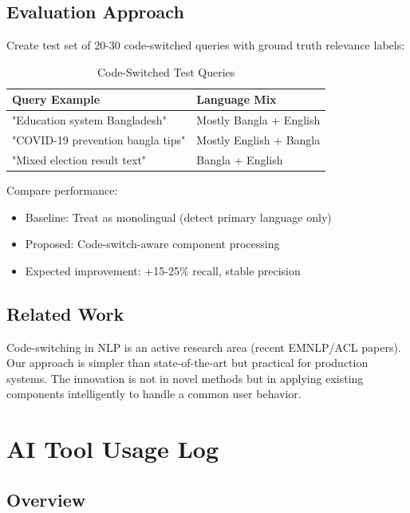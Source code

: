 \documentclass[12pt,a4paper]{report}
\begin{document}
\section{Evaluation Approach}

Create test set of 20-30 code-switched queries with ground truth relevance labels:

\begin{table}[H]
    \centering
    \begin{tabular}{|l|l|}
        \hline
        \textbf{Query Example} & \textbf{Language Mix} \\
        \hline
        "Education system Bangladesh" & Mostly Bangla + English \\
        \hline
        "COVID-19 prevention bangla tips" & Mostly English + Bangla \\
        \hline
        "Mixed election result text" & Bangla + English \\
        \hline
    \end{tabular}
    \caption{Code-Switched Test Queries}
\end{table}

Compare performance:
\begin{itemize}
    \item Baseline: Treat as monolingual (detect primary language only)
    \item Proposed: Code-switch-aware component processing
    \item Expected improvement: +15-25\% recall, stable precision
\end{itemize}

\section{Related Work}

Code-switching in NLP is an active research area (recent EMNLP/ACL papers). Our approach is simpler than state-of-the-art but practical for production systems. The innovation is not in novel methods but in applying existing components intelligently to handle a common user behavior.

\newpage

\appendix
\chapter{AI Tool Usage Log}

\section{Overview}
\end{document}
